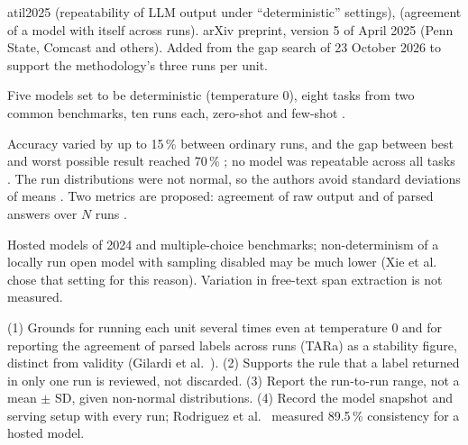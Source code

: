 \begin{papercard}{atil2025}
  (repeatability of LLM output under ``deterministic'' settings),  (agreement of a model with itself across runs). arXiv preprint, version 5 of April 2025 (Penn State, Comcast and others). Added from the gap search of 23 October 2026 to support the methodology's three runs per unit.

 Five models set to be deterministic (temperature 0), eight tasks from two common benchmarks, ten runs each, zero-shot and few-shot .

 Accuracy varied by up to 15\,\% between ordinary runs, and the gap between best and worst possible result reached 70\,\% ; no model was repeatable across all tasks . The run distributions were not normal, so the authors avoid standard deviations of means . Two metrics are proposed: agreement of raw output and of parsed answers over $N$ runs .

 Hosted models of 2024 and multiple-choice benchmarks; non-determinism of a locally run open model with sampling disabled may be much lower (Xie et al.\  chose that setting for this reason). Variation in free-text span extraction is not measured.

 (1) Grounds for running each unit several times even at temperature 0 and for reporting the agreement of parsed labels across runs (TARa) as a stability figure, distinct from validity (Gilardi et al.\ ). (2) Supports the rule that a label returned in only one run is reviewed, not discarded. (3) Report the run-to-run range, not a mean $\pm$ SD, given non-normal distributions. (4) Record the model snapshot and serving setup with every run; Rodriguez et al.\  measured 89.5\,\% consistency for a hosted model.
\end{papercard}
